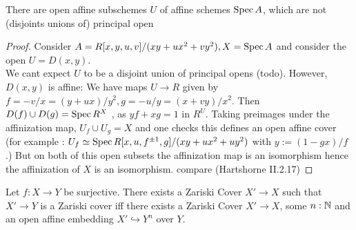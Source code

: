 \begin{example}
	There are open affine subschemes $U$ of affine schemes $\operatorname{Spec} A$, which are not (disjoints unions of) principal open
\end{example}
\begin{proof}
	Consider $A = R[x,y,u,v]/(xy + ux^2 + vy^2), X= \operatorname{Spec} A$ and consider the open $U = D(x,y)$. \\
	We cant expect $U$ to be a disjoint union of principal opens (todo). However, $D(x,y)$ is affine: We have maps $U \to R$ given by
	$f = -v/x = (y+ux)/y^2 , g= -u/y = (x+vy)/x^2$. 
	Then $D(f) \cup D(g) = \operatorname{Spec} R^X$ , as $yf + xg = 1$ in $R^U$.
	Taking preimages under the affinization map, $U_f \cup U_g = X$ and one checks this defines an open affine cover (for example : $U_f \simeq \operatorname{Spec} R[x,u,f^{\pm 1}, g] / (xy + ux^2 + uy^2)$ with $y := (1-gx)/f$.)
	But on both of this open subsets the affinization map is an isomorphism
	hence the affinization of $X$ is an isomorphism.
	compare (Hartshorne II.2.17)
\end{proof}

\begin{lemma}
	Let $f : X \to Y$ be surjective. There exists a Zariski Cover $X' \to X$ such that $X' \to Y$ is a Zariski cover iff there exists a Zariski Cover $X' \to X$, some $n : \mathbb{N}$ and an open affine embedding $X' \hookrightarrow Y^n$ over $Y$.
\end{lemma}

